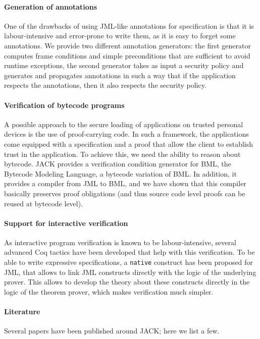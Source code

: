 \documentclass[]{llncs}
\begin{document}
\paragraph{Generation of annotations}
One of the drawbacks of using JML-like annotations for specification
is that it is labour-intensive and error-prone to write them, as it is
easy to forget some annotations. We provide two different annotation
generators: the first generator computes frame conditions and simple
preconditions that are sufficient to avoid runtime exceptions, the
second generator takes as input a security policy and generates and
propagates annotations in such a way that if the application respects
the annotations, then it also respects the security policy.

\paragraph{Verification of bytecode programs}
A possible approach to the secure loading of applications on trusted
personal devices is the use of proof-carrying code. In such a
framework, the applications come equipped with a specification and a
proof that allow the client to establish trust in the application. To
achieve this, we need the ability to reason about bytecode. JACK
provides a verification condition generator for BML, the Bytecode
Modeling Language, a bytecode variation of BML. In addition, it
provides a compiler from JML to BML, and we have shown that this
compiler basically preserves proof obligations (and thus source code
level proofs can be reused at bytecode level).

\paragraph{Support for interactive verification}
As interactive program verification is known to be labour-intensive,
several advanced Coq tactics have been developed that help with this
verification. To be able to write expressive specifications, a
\texttt{native} construct has been proposed for JML, that allows to
link JML constructs directly with the logic of the underlying
prover. This allows to develop the theory about these constructs
directly in the logic of the theorem prover, which makes verification
much simpler.

\paragraph{Literature}
Several papers have been published around JACK; here we list a few.

\nocite{BRL03:fme,Charles06,m+04:cardis,BurdyP06}



\end{document}
